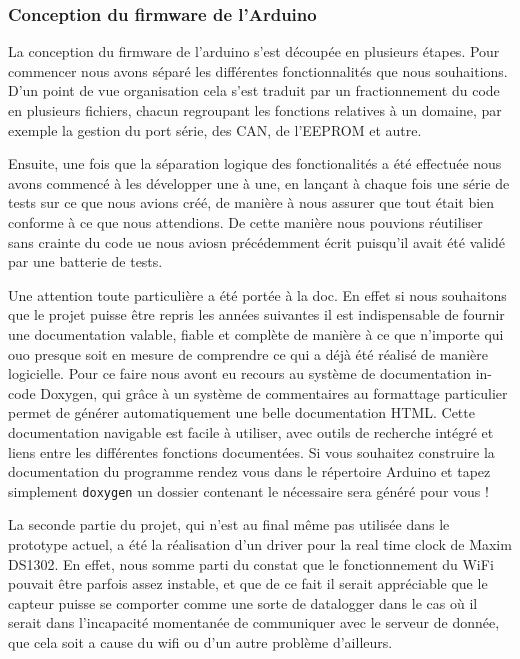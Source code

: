 		\subsubsection{Conception du firmware de l'Arduino}
		La conception du firmware de l'arduino s'est découpée en plusieurs étapes.
		Pour commencer nous avons séparé les différentes fonctionnalités que nous
		souhaitions. D'un point de vue organisation cela s'est traduit par un fractionnement
		du code en plusieurs fichiers, chacun regroupant les fonctions relatives à un
		domaine, par exemple la gestion du port série, des CAN, de l'EEPROM et autre.
		\par
		Ensuite, une fois que la séparation logique des fonctionalités a été effectuée
		nous avons commencé à les développer une à une, en lançant à chaque fois une
		série de tests sur ce que nous avions créé, de manière à nous assurer que tout
		était bien conforme à ce que nous attendions. De cette manière nous pouvions
		réutiliser sans crainte du code ue nous aviosn précédemment écrit puisqu'il
		avait été validé par une batterie de tests.
		\par
		Une attention toute particulière a été portée à la doc. En effet si nous
		souhaitons que le projet puisse être repris les années suivantes il
		est indispensable de fournir une documentation valable, fiable et complète
		de manière à ce que n'importe qui ouo presque soit en mesure de comprendre
		ce qui a déjà été réalisé de manière logicielle. Pour ce faire nous avont eu
		recours au système de documentation in-code Doxygen, qui grâce à un
		système de commentaires au formattage particulier permet de générer automatiquement
		une belle documentation HTML. Cette documentation navigable est facile à utiliser, avec outils
		de recherche intégré et liens entre les différentes fonctions documentées.
		Si vous souhaitez construire la documentation du programme rendez vous dans
		le répertoire Arduino et tapez simplement \texttt{doxygen} un dossier contenant
		le nécessaire sera généré pour vous !
		\par
		La seconde partie du projet, qui n'est au final même pas utilisée dans le prototype
		actuel, a été la réalisation d'un driver pour la real time clock de Maxim DS1302. En
		effet, nous somme parti du constat que le fonctionnement du WiFi pouvait être parfois
		assez instable, et que de ce fait il serait appréciable que le capteur puisse se comporter
		comme une sorte de datalogger dans le cas où il serait dans l'incapacité momentanée de communiquer
		avec le serveur de donnée, que cela soit a cause du wifi ou d'un autre problème d'ailleurs.
